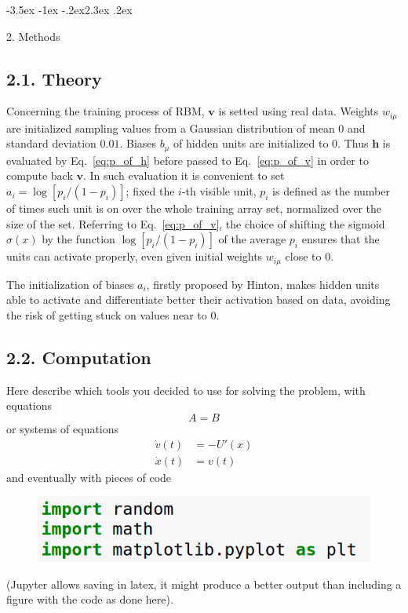 \documentclass[prl,twocolumn]{revtex4-1}
\makeatletter
\renewcommand{\section}{\@startsection{section}{1}{\z@}%
	{-3.5ex \@plus -1ex \@minus -.2ex}{2.3ex \@plus.2ex}%
	{\normalfont\bfseries\raggedright}}
\makeatother
\begin{document}
\section{2. Methods}
\subsection{2.1. Theory}

Concerning the training process of RBM, $\mathbf{v}$ is setted using real data. Weights $w_{i\mu}$ are initialized sampling values from a Gaussian distribution of mean $0$ and standard deviation $0.01$. Biases $b_\mu$ of hidden units are initialized to $0$. Thus $\mathbf{h}$ is evaluated by Eq.~\ref{eq:p_of_h} before passed to Eq.~\ref{eq:p_of_v} in order to compute back $\mathbf{v}$. In such evaluation it is convenient to set $a_i=\log[p_i/(1-p_i)]$; fixed the $i$-th visible unit, $p_i$ is defined as the number of times such unit is on over the whole training array set, normalized over the size of the set. Referring to Eq.~\ref{eq:p_of_v}, the choice of shifting the sigmoid $\sigma(x)$ by the function $\log[p_i/(1-p_i)]$ of the average $p_i$ ensures that the units can activate properly, even given initial weights $w_{i\mu}$ close to $0$.

The initialization of biases $a_i$, firstly proposed by Hinton, makes hidden units able to activate and differentiate better their activation based on data, avoiding the risk of getting stuck on values near to $0$.

\subsection{2.2. Computation}





 Here describe which tools you decided to use for solving the problem, with
 equations
\begin{equation}
  A=B
  \label{eq:simple}
\end{equation}
or systems of equations
\begin{align}
  \dot v(t) & =  -U'(x)\nonumber \\
  \dot x(t) & =  v(t)
  \label{eq:motion}
\end{align}
and  eventually with  pieces of code
\begin{figure}[h]
  \includegraphics[width=0.7\columnwidth]{line1.png}
\end{figure}
(Jupyter allows saving in latex, it might produce a better output than including a figure with the code as done here).
\end{document}
